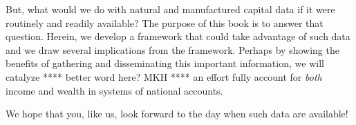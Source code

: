 But, what would we do with natural and manufactured capital data if it were 
routinely and readily available? 
The purpose of this book is to answer that question.
Herein, we develop a framework that could take advantage of such data
and we draw several implications from the framework. 
Perhaps by showing the benefits of gathering and disseminating
this important information, 
we will catalyze **** better word here? MKH **** an effort 
fully account for \emph{both} income and wealth in systems of national accounts.

We hope that you, like us, look forward to the day when such data are available!







%
%


